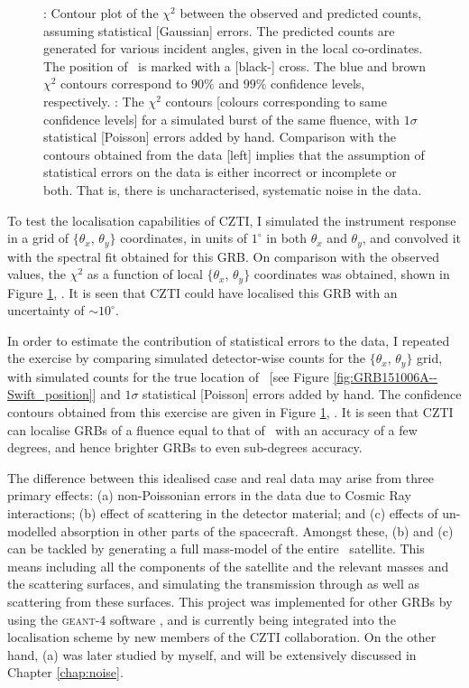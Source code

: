 \begin{figure}
\begin{center}
\caption[Localisation capabilities of \AS -CZTI: theory and practice]{\eL: Contour plot of the $\chi^2$ between the observed and predicted counts, assuming statistical [Gaussian] errors. The predicted counts are generated for various incident angles, given in the local co-ordinates. The position of \grb\ is marked with a [black-] cross. The blue and brown $\chi^2$ contours correspond to $90 \%$ and $99 \%$ confidence levels, respectively. \eR: The $\chi^2$ contours [colours corresponding to same confidence levels] for a simulated burst of the same fluence, with $1 \sigma$ statistical [Poisson] errors added by hand. Comparison with the contours obtained from the data [left] implies that the assumption of statistical errors on the data is either incorrect or incomplete or both. That is, there is uncharacterised, systematic noise in the data.}
\label{fig:GRB151006A--contours}
\end{center}
\end{figure}

To test the localisation capabilities of CZTI, I simulated the instrument response in a grid of $\{ \theta_x$, $\theta_y \}$ coordinates, in units of $1^{\circ}$ in both $\theta_x$ and $\theta_y$, and convolved it with the spectral fit obtained for this GRB. On comparison with the observed values, the $\chi^2$ as a function of local $\{ \theta_x$, $\theta_y \}$ coordinates was obtained, shown in Figure \ref{fig:GRB151006A--contours}, \eL. It is seen that CZTI could have localised this GRB with an uncertainty of $\sim 10^{\circ}$.

In order to estimate the contribution of statistical errors to the data, I repeated the exercise by comparing simulated detector-wise counts for the $\{ \theta_x$, $\theta_y \}$ grid, with simulated counts for the true location of \grb\ [see Figure \ref{fig:GRB151006A--Swift_position}] and $1 \sigma$ statistical [Poisson] errors added by hand. The confidence contours obtained from this exercise are given in Figure \ref{fig:GRB151006A--contours}, \eR. It is seen that CZTI can localise GRBs of a fluence equal to that of \grb\ with an accuracy of a few degrees, and hence brighter GRBs to even sub-degrees accuracy.

The difference between this idealised case and real data may arise from three primary effects: (a) non-Poissonian errors in the data due to Cosmic Ray interactions; (b) effect of scattering in the detector material; and (c) effects of un-modelled absorption in other parts of the spacecraft. Amongst these, (b) and (c) can be tackled by generating a full mass-model of the entire \AS\ satellite. This means including all the components of the satellite and the relevant masses and the scattering surfaces, and simulating the transmission through as well as scattering from these surfaces. This project was implemented for other GRBs by using the \textsc{geant-4} software \citep{Bhalerao_et_al.-2017-ApJ-A_Tale_of_Two_Transients}, and is currently being integrated into the localisation scheme by new members of the CZTI collaboration. On the other hand, (a) was later studied by myself, and will be extensively discussed in Chapter \ref{chap:noise}.

